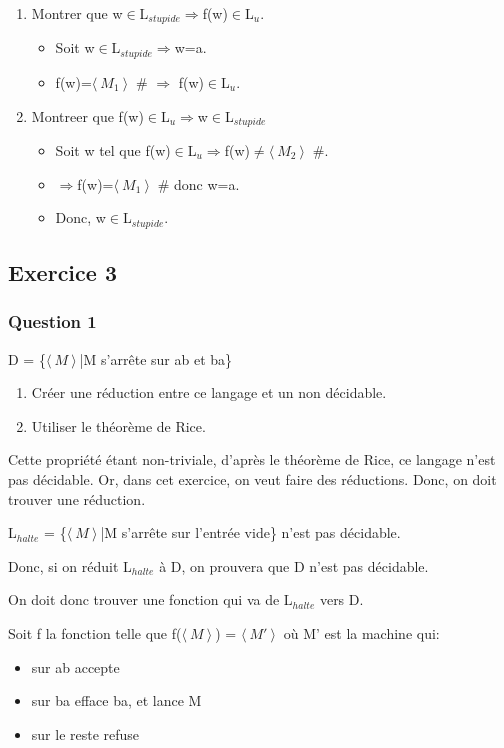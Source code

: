\begin{enumerate}
  \item Montrer que w$\in$L$_{stupide}\Rightarrow$f(w)$\in$L$_u$.
  \begin{itemize}
    \item Soit w$\in$L$_{stupide}\Rightarrow$w=a.
    \item f(w)=$\langle\ M_1\ \rangle \!\ $ \# $\Rightarrow$ f(w)$\in$L$_u$.
  \end{itemize}
  \item Montreer que f(w)$\in$L$_u\Rightarrow$w$\in$L$_{stupide}$
  \begin{itemize}
    \item Soit w tel que f(w)$\in$L$_u\Rightarrow$f(w)$\neq\langle\ M_2\ \rangle \!\ $ \#.
    \item $\Rightarrow$f(w)=$\langle\ M_1\ \rangle \!\ $ \# donc w=a.
    \item Donc, w$\in$L$_{stupide}$.
  \end{itemize}
\end{enumerate}

\subsection{Exercice 3}

\subsubsection{Question 1}

D = \{$\langle\ M\ \rangle \!\ $|M s'arrête sur ab et ba\}

\begin{enumerate}
  \item Créer une réduction entre ce langage et un non décidable.
  \item Utiliser le théorème de Rice.
\end{enumerate}

Cette propriété étant non-triviale, d'après le théorème de Rice, ce langage n'est pas décidable.
Or, dans cet exercice, on veut faire des réductions. Donc, on doit trouver une réduction.

L$_{halte}$ = \{$\langle\ M\ \rangle \!\ $|M s'arrête sur l'entrée vide\} n'est pas décidable.

Donc, si on réduit L$_{halte}$ à D, on prouvera que D n'est pas décidable.

On doit donc trouver une fonction qui va de L$_{halte}$ vers D.

Soit f la fonction telle que f($\langle\ M\ \rangle \!\ $) = $\langle\ M'\ \rangle \!\ $ où M' est la machine qui:
\begin{itemize}
  \item sur ab accepte
  \item sur ba efface ba, et lance M
  \item sur le reste refuse
\end{itemize}

